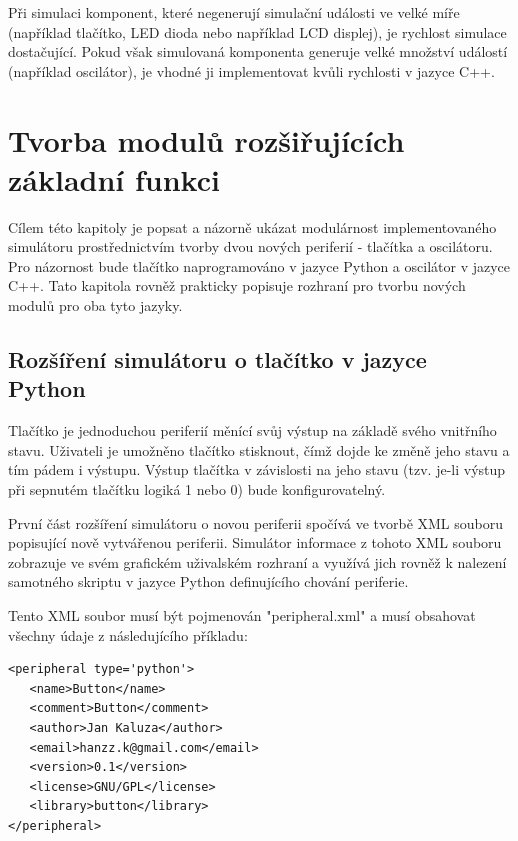 Při simulaci komponent, které negenerují simulační události ve velké míře (například tlačítko, LED dioda nebo například LCD displej), je rychlost simulace dostačující. Pokud však simulovaná komponenta generuje velké množství událostí (například oscilátor), je vhodné ji implementovat kvůli rychlosti v jazyce C++.

\chapter{Tvorba modulů rozšiřujících základní funkci}
\label{pripad}

Cílem této kapitoly je popsat a názorně ukázat modulárnost implementovaného simulátoru prostřednictvím tvorby dvou nových periferií - tlačítka a oscilátoru. Pro názornost bude tlačítko naprogramováno v jazyce Python a oscilátor v jazyce C++. Tato kapitola rovněž prakticky popisuje rozhraní pro tvorbu nových modulů pro oba tyto jazyky.

\section{Rozšíření simulátoru o tlačítko v jazyce Python}
\label{tlacitko}

Tlačítko je jednoduchou periferií měnící svůj výstup na základě svého vnitřního stavu. Uživateli je umožněno tlačítko stisknout, čímž dojde ke změně jeho stavu a tím pádem i výstupu. Výstup tlačítka v závislosti na jeho stavu (tzv. je-li výstup při sepnutém tlačítku logiká 1 nebo 0) bude konfigurovatelný.

První část rozšíření simulátoru o novou periferii spočívá ve tvorbě XML souboru popisující nově vytvářenou periferii. Simulátor informace z tohoto XML souboru zobrazuje ve svém grafickém uživalském rozhraní a využívá jich rovněž k nalezení samotného skriptu v jazyce Python definujícího chování periferie.

Tento XML soubor musí být pojmenován "peripheral.xml" a musí obsahovat všechny údaje z následujícího příkladu:

\lstset{language=XML, numbers=left, frame=single, breaklines=true, tabsize=2, xleftmargin=20pt}
\begin{lstlisting}
<peripheral type='python'>
   <name>Button</name>
   <comment>Button</comment>
   <author>Jan Kaluza</author>
   <email>hanzz.k@gmail.com</email>
   <version>0.1</version>
   <license>GNU/GPL</license>
   <library>button</library>
</peripheral>
\end{lstlisting}

